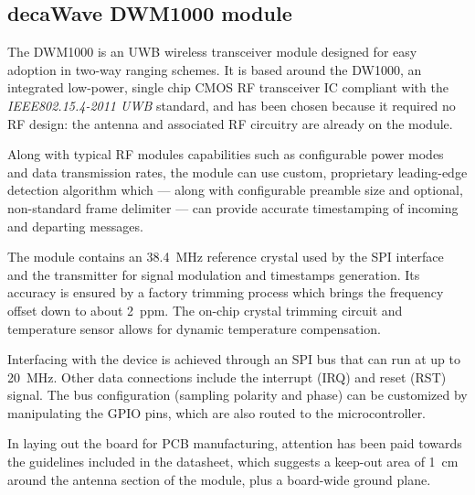 \subsection{decaWave DWM1000 module}

The DWM1000 is an UWB wireless transceiver module designed for easy adoption in two-way ranging schemes.
It is based around the DW1000, an integrated low-power, single chip CMOS RF transceiver IC compliant with the \emph{IEEE802.15.4-2011 UWB} standard, and has been chosen because it required no RF design: the antenna and associated RF circuitry are already on the module.

Along with typical RF modules capabilities such as configurable power modes and data transmission rates, the module can use custom, proprietary leading-edge detection algorithm which --- along with configurable preamble size and optional, non-standard frame delimiter --- can provide accurate timestamping of incoming and departing messages.

The module contains an \SI{38.4}{\mega\hertz} reference crystal used by the SPI interface and the transmitter for signal modulation and timestamps generation.
Its accuracy is ensured by a factory trimming process which brings the frequency offset down to about \SI{2}{ppm}.
The on-chip crystal trimming circuit and temperature sensor allows for dynamic temperature compensation.

Interfacing with the device is achieved through an SPI bus that can run at up to \SI{20}{\mega\hertz}.
Other data connections include the interrupt (IRQ) and reset (RST) signal.
The bus configuration (sampling polarity and phase) can be customized by manipulating the GPIO pins, which are also routed to the microcontroller.


In laying out the board for PCB manufacturing, attention has been paid towards the guidelines included in the datasheet, which suggests a keep-out area of \SI{1}{\centi\meter} around the antenna section of the module, plus a board-wide ground plane.
